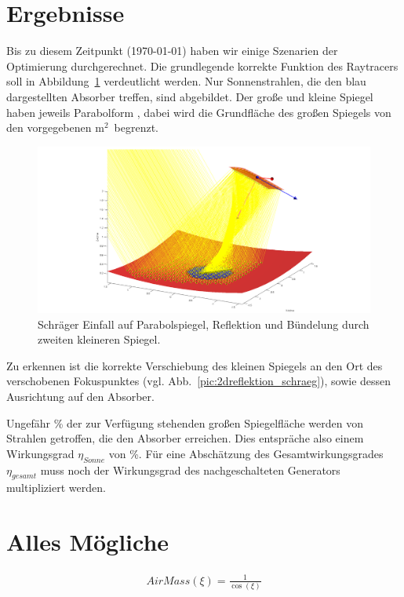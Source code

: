 \documentclass[fontsize=10pt,paper=a4,bibliography=totoc]{scrartcl}
\newcommand{\felix}[1]{{ \color{darkgreen} #1}}
\begin{document}
\section{Ergebnisse}
\felix{
Bis zu diesem Zeitpunkt (\today) haben wir einige Szenarien der Optimierung durchgerechnet. Die grundlegende korrekte Funktion des Raytracers soll in Abbildung~\ref{pic:netteReflektion} verdeutlicht werden. Nur Sonnenstrahlen, die den blau dargestellten Absorber treffen, sind abgebildet. Der große und kleine Spiegel haben jeweils Parabolform , dabei wird die Grundfläche des großen Spiegels von den vorgegebenen \unit[10]{m$^2$} begrenzt.

\begin{figure}[htb]
	\centering
	\includegraphics[width=\textwidth]{images/netteReflektion}
	\caption[Bündelung schräg]{Schräger Einfall auf Parabolspiegel, Reflektion und Bündelung durch zweiten kleineren Spiegel.}
	\label{pic:netteReflektion}
\end{figure}

Zu erkennen ist die korrekte Verschiebung des kleinen Spiegels an den Ort des verschobenen Fokuspunktes (vgl. Abb.~\ref{pic:2dreflektion_schraeg}), sowie dessen Ausrichtung auf den Absorber.

Ungefähr \unit[40]{\%} der zur Verfügung stehenden großen Spiegelfläche werden von Strahlen getroffen, die den Absorber erreichen. Dies entspräche also einem Wirkungsgrad $\eta_{Sonne}$ von \unit[40]{\%}. Für eine Abschätzung des Gesamtwirkungsgrades $\eta_{gesamt}$ muss noch der Wirkungsgrad des nachgeschalteten Generators multipliziert werden.
}
\section{Alles Mögliche}

\begin{align*}
	AirMass(\xi)=\frac{1}{\cos(\xi)}
\end{align*}
\end{document}
